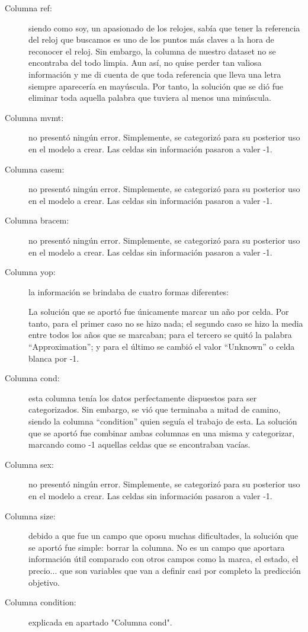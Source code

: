 \begin{description}
	\item[Columna ref:] siendo como soy, un apasionado de los relojes, sabía que tener la referencia del reloj que buscamos es uno de los puntos más claves a la hora de reconocer el reloj. Sin embargo, la columna de nuestro dataset no se encontraba del todo limpia. Aun así, no quise perder tan valiosa información y me di cuenta de que toda referencia que lleva una letra siempre aparecería en mayúscula. Por tanto, la solución que se dió fue eliminar toda aquella palabra que tuviera al menos una minúscula.
	\item[Columna mvmt:] no presentó ningún error. Simplemente, se categorizó para su posterior uso en el modelo a crear. Las celdas sin información pasaron a valer -1.
	\item[Columna casem:] no presentó ningún error. Simplemente, se categorizó para su posterior uso en el modelo a crear. Las celdas sin información pasaron a valer -1.
	\item[Columna bracem:] no presentó ningún error. Simplemente, se categorizó para su posterior uso en el modelo a crear. Las celdas sin información pasaron a valer -1.
	\item[Columna yop:] la información se brindaba de cuatro formas diferentes:
	La solución que se aportó fue únicamente marcar un año por celda. Por tanto, para el primer caso no se hizo nada; el segundo caso se hizo la media entre todos los años que se marcaban; para el tercero se quitó la palabra “Approximation”; y para el último se cambió el valor “Unknown” o celda blanca por -1.
	\item[Columna cond:] esta columna tenía los datos perfectamente dispuestos para ser categorizados. Sin embargo, se vió que terminaba a mitad de camino, siendo la columna “condition” quien seguía el trabajo de esta. La solución que se aportó fue combinar ambas columnas en una misma y categorizar, marcando como -1 aquellas celdas que se encontraban vacías.
	\item[Columna sex:] no presentó ningún error. Simplemente, se categorizó para su posterior uso en el modelo a crear. Las celdas sin información pasaron a valer -1.
	\item[Columna size:] debido a que fue un campo que oposu muchas dificultades, la solución que se aportó fue simple: borrar la columna. No es un campo que aportara información útil comparado con otros campos como la marca, el estado, el precio... que son variables que van a definir casi por completo la predicción objetivo.
	\item[Columna condition:] explicada en apartado "Columna cond".
\end{description}
	
